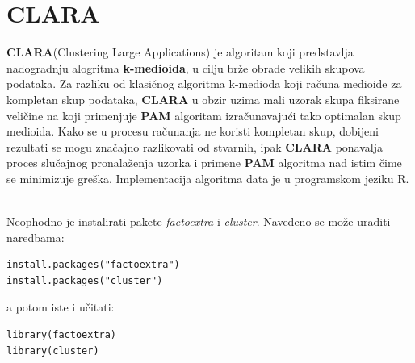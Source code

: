 \documentclass[a4paper]{article}
\begin{document}
\section{CLARA}
\textbf{CLARA}(Clustering Large Applications) je algoritam koji predstavlja nadogradnju alogritma \textbf{k-medioida}, u cilju brže obrade velikih skupova podataka.
Za razliku od klasičnog algoritma k-medioda koji računa medioide za kompletan skup podataka, \textbf{CLARA} u obzir uzima mali uzorak skupa fiksirane veličine na koji primenjuje \textbf{PAM} algoritam izračunavajući tako optimalan skup medioida.
Kako se u procesu računanja ne koristi kompletan skup, dobijeni rezultati se mogu značajno razlikovati od stvarnih, ipak \textbf{CLARA} ponavalja proces slučajnog pronalaženja uzorka i primene \textbf{PAM} algoritma nad istim čime se minimizuje greška. Implementacija algoritma data je u programskom jeziku R.

\\

Neophodno je instalirati pakete \textit{factoextra} i \textit{cluster}. Navedeno se može uraditi naredbama:

\begin{tcolorbox}
\begin{verbatim}
install.packages("factoextra")
install.packages("cluster")
\end{verbatim}
\end{tcolorbox}

a potom iste i učitati:

\begin{tcolorbox}
\begin{verbatim}
library(factoextra)
library(cluster)
\end{verbatim}
\end{tcolorbox}
\end{document}
